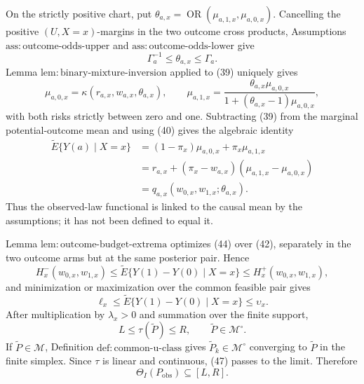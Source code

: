 On the strictly positive chart, put \(\theta_{a,x}=\operatorname{OR}(\mu_{a,1,x},\mu_{a,0,x})\).  Cancelling the positive \((U,X=x)\)-margins in the two outcome cross products, Assumptions \(\mathrm{ass{:}outcome\text{-}odds\text{-}upper}\) and \(\mathrm{ass{:}outcome\text{-}odds\text{-}lower}\) give
\[
 \Gamma_a^{-1}\leq\theta_{a,x}\leq\Gamma_a.                          \tag{42}
\]
Lemma \(\mathrm{lem{:}binary\text{-}mixture\text{-}inversion}\) applied to (39) uniquely gives
\[
 \mu_{a,0,x}=\kappa(r_{a,x},w_{a,x},\theta_{a,x}),
 \qquad
 \mu_{a,1,x}
 =\frac{\theta_{a,x}\mu_{a,0,x}}
        {1+(\theta_{a,x}-1)\mu_{a,0,x}},                               \tag{43}
\]
with both risks strictly between zero and one.  Subtracting (39) from the marginal potential-outcome mean and using (40) gives the algebraic identity
\[
\begin{aligned}
 \widetilde E\{Y(a)\mid X=x\}
 &=(1-\pi_x)\mu_{a,0,x}+\pi_x\mu_{a,1,x}\\
 &=r_{a,x}+(\pi_x-w_{a,x})(\mu_{a,1,x}-\mu_{a,0,x})\\
 &=q_{a,x}(w_{0,x},w_{1,x};\theta_{a,x}).
\end{aligned}                                                           \tag{44}
\]
Thus the observed-law functional is linked to the causal mean by the assumptions; it has not been defined to equal it.

Lemma \(\mathrm{lem{:}outcome\text{-}budget\text{-}extrema}\) optimizes (44) over (42), separately in the two outcome arms but at the same posterior pair.  Hence
\[
 H_x^-(w_{0,x},w_{1,x})
 \leq \widetilde E\{Y(1)-Y(0)\mid X=x\}
 \leq H_x^+(w_{0,x},w_{1,x}),                                         \tag{45}
\]
and minimization or maximization over the common feasible pair gives
\[
 \ell_x\leq\widetilde E\{Y(1)-Y(0)\mid X=x\}\leq\upsilon_x.          \tag{46}
\]
After multiplication by \(\lambda_x>0\) and summation over the finite support,
\[
 L\leq\tau(\widetilde P)\leq R,
 \qquad \widetilde P\in\mathcal M^{\circ}.                            \tag{47}
\]
If \(\widetilde P\in\mathcal M\), Definition \(\mathrm{def{:}common\text{-}u\text{-}class}\) gives \(\widetilde P_k\in\mathcal M^{\circ}\) converging to \(\widetilde P\) in the finite simplex.  Since \(\tau\) is linear and continuous, (47) passes to the limit.  Therefore
\[
 \Theta_I(P_{\mathrm{obs}})\subseteq[L,R].                             \tag{48}
\]

